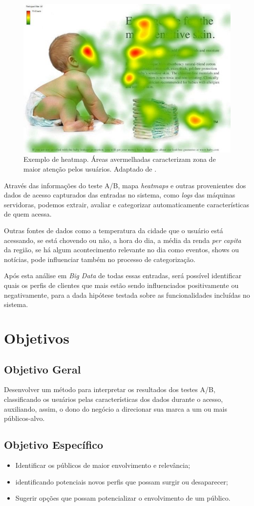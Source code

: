 \documentclass[12pt]{article}
\begin{document}
\begin{figure}[ht]
\centering
\includegraphics[width=.5\textwidth]{fig1.jpg}
\caption{Exemplo de heatmap. Áreas avermelhadas caracterizam zona de maior atenção pelos usuários. Adaptado de \cite{goward:13}.}
\label{fig:heatmap1}
\end{figure}

Através das informações do teste A/B, mapa \textit{heatmaps} e outras provenientes dos dados de acesso capturados das entradas no sistema, como \textit{logs} das máquinas servidoras, podemos extrair, avaliar e categorizar automaticamente características de quem acessa.

Outras fontes de dados como a temperatura da cidade que o usuário está acessando, se está chovendo ou não, a hora do dia, a média da renda \textit{per capita} da região, se há algum acontecimento relevante no dia como eventos, shows ou notícias, pode influenciar também no processo de categorização.

Após esta análise em \textit{Big Data} de todas essas entradas, será possível identificar quais os perfis de clientes que mais estão sendo influenciados positivamente ou negativamente, para a dada hipótese testada sobre as funcionalidades incluídas no sistema.

\section{Objetivos}
\subsection{Objetivo Geral}
Desenvolver um método para interpretar os resultados dos testes A/B, classificando os usuários pelas características dos dados durante o acesso, auxiliando, assim, o dono do negócio a direcionar sua marca a um ou mais públicos-alvo.

\subsection{Objetivo Específico}
\begin{itemize}
\item Identificar os públicos de maior envolvimento e relevância;
\item identificando potenciais novos perfis que possam surgir ou desaparecer;
\item Sugerir opções que possam potencializar o envolvimento de um público.
\end{itemize}
\end{document}
